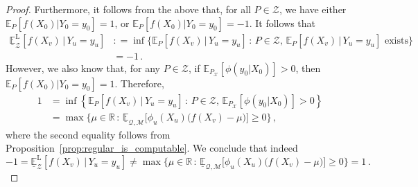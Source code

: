 \documentclass[twoside,11pt]{article}
\newcommand{\reals}{\mathbb{R}}
\newcommand{\states}{\mathcal{X}}
\newcommand{\lexp}{\underline{\mathbb{E}}_{\rateset,\mathcal{M}}}
\newcommand{\rateset}{\mathcal{Q}}
\newcommand{\coloneqq}{:\!=}
\begin{document}
\begin{proof}
Furthermore, it follows from the above that, for all $P\in\mathcal{Z}$, we have either $\mathbb{E}_P[f(X_0)\vert Y_0=y_0]=1$, or $\mathbb{E}_P[f(X_0)\vert Y_0=y_0]=-1$. It follows that
\begin{align*}
\underline{\mathbb{E}}_\mathcal{Z}^\mathrm{L}[f(X_v)\,\vert\, Y_u=y_u] &\coloneqq \inf\bigl\{\mathbb{E}_P[f(X_v)\,\vert\,Y_u=y_u]\,:\,P\in\mathcal{Z},\,\text{$\mathbb{E}_P[f(X_v)\,\vert\,Y_u=y_u]$ exists}\bigr\} \\
 &= -1\,.
\end{align*}
However, we also know that, for any $P\in\mathcal{Z}$, if $\mathbb{E}_{P_\states}[\phi(y_0\vert X_0)]>0$, then $\mathbb{E}_{P}[f(X_0)\vert Y_0=y_0]=1$. Therefore,
\begin{align*}
1 &= \inf\left\{\mathbb{E}_P[f(X_v)\,\vert\,Y_u=y_u]\,:\,P\in\mathcal{Z},\,\mathbb{E}_{P_\states}[\phi(y_0\vert X_0)]>0\right\} \\
 &= \max\{\mu\in\reals\,:\,\lexp\bigl[\phi_u(X_u)\bigl(f(X_v)-\mu\bigr)\bigr]\geq 0\}\,,
\end{align*}
where the second equality follows from Proposition~\ref{prop:regular_is_computable}. We conclude that indeed
\begin{equation*}
-1 = \underline{\mathbb{E}}_\mathcal{Z}^\mathrm{L}[f(X_v)\,\vert\, Y_u=y_u] \neq 
\max\{\mu\in\reals\,:\,\lexp\bigl[\phi_u(X_u)\bigl(f(X_v)-\mu\bigr)\bigr]\geq 0\} = 1\,.
\end{equation*}
\end{proof}
\end{document}
